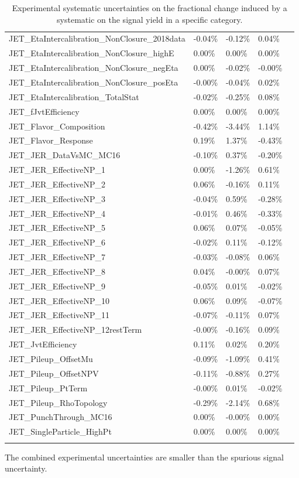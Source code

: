 \begin{center}
\begin{longtable}{|l|l|l|l|l|}
 JET\_EtaIntercalibration\_NonClosure\_2018data   & -0.04\%   & -0.12\%   & 0.04\%   \\
 JET\_EtaIntercalibration\_NonClosure\_highE   & 0.00\%   & 0.00\%   & 0.00\%   \\
 JET\_EtaIntercalibration\_NonClosure\_negEta   & 0.00\%   & -0.02\%   & -0.00\%   \\
 JET\_EtaIntercalibration\_NonClosure\_posEta   & -0.00\%   & -0.04\%   & 0.02\%   \\
 JET\_EtaIntercalibration\_TotalStat   & -0.02\%   & -0.25\%   & 0.08\%   \\
 JET\_fJvtEfficiency   & 0.00\%   & 0.00\%   & 0.00\%   \\
 JET\_Flavor\_Composition   & -0.42\%   & -3.44\%   & 1.14\%   \\
 JET\_Flavor\_Response   & 0.19\%   & 1.37\%   & -0.43\%   \\
 JET\_JER\_DataVsMC\_MC16   & -0.10\%   & 0.37\%   & -0.20\%   \\
 JET\_JER\_EffectiveNP\_1   & 0.00\%   & -1.26\%   & 0.61\%   \\
 JET\_JER\_EffectiveNP\_2   & 0.06\%   & -0.16\%   & 0.11\%   \\
 JET\_JER\_EffectiveNP\_3   & -0.04\%   & 0.59\%   & -0.28\%   \\
 JET\_JER\_EffectiveNP\_4   & -0.01\%   & 0.46\%   & -0.33\%   \\
 JET\_JER\_EffectiveNP\_5   & 0.06\%   & 0.07\%   & -0.05\%   \\
 JET\_JER\_EffectiveNP\_6   & -0.02\%   & 0.11\%   & -0.12\%   \\
 JET\_JER\_EffectiveNP\_7   & -0.03\%   & -0.08\%   & 0.06\%   \\
 JET\_JER\_EffectiveNP\_8   & 0.04\%   & -0.00\%   & 0.07\%   \\
 JET\_JER\_EffectiveNP\_9   & -0.05\%   & 0.01\%   & -0.02\%   \\
 JET\_JER\_EffectiveNP\_10   & 0.06\%   & 0.09\%   & -0.07\%   \\
 JET\_JER\_EffectiveNP\_11   & -0.07\%   & -0.11\%   & 0.07\%   \\
 JET\_JER\_EffectiveNP\_12restTerm   & -0.00\%   & -0.16\%   & 0.09\%   \\
 JET\_JvtEfficiency   & 0.11\%   & 0.02\%   & 0.20\%   \\
 JET\_Pileup\_OffsetMu   & -0.09\%   & -1.09\%   & 0.41\%   \\
 JET\_Pileup\_OffsetNPV   & -0.11\%   & -0.88\%   & 0.27\%   \\
 JET\_Pileup\_PtTerm   & -0.00\%   & 0.01\%   & -0.02\%   \\
 JET\_Pileup\_RhoTopology   & -0.29\%   & -2.14\%   & 0.68\%   \\
 JET\_PunchThrough\_MC16   & 0.00\%   & -0.00\%   & 0.00\%   \\
 JET\_SingleParticle\_HighPt   & 0.00\%   & 0.00\%   & 0.00\%   \\
 \caption{Experimental systematic uncertainties on the fractional change induced by a systematic on the signal yield in a specific category.}
\label{tab:hmmExpUncert}
\end{longtable}
\end{center}



The combined experimental uncertainties are smaller than the spurious signal uncertainty.
